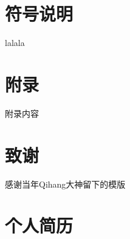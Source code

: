 \documentclass{tjumaster}
\begin{document}
	\makethesiscover %

	\frontmatter %

\begin{cabstract}
	
	
\end{cabstract}

\begin{eabstract}
		
	
	
\end{eabstract}

\tableofcontents  %
\clearpage %


\mainmatter %


\clearpage
\backmatter %


\tocless\section{符号说明}
lalala

\clearpage





\clearpage

\tocless \section{附录}
附录内容

\clearpage

\tocless \section{致谢}
	感谢当年Qihang大神留下的模版\cite{qihang}

\clearpage

\tocless \section{个人简历}
\end{document}
